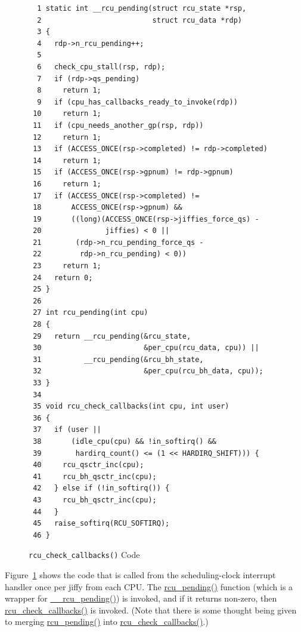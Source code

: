 \begin{figure}[tbp]
{ \scriptsize
\begin{verbatim}
  1 static int __rcu_pending(struct rcu_state *rsp,
  2                          struct rcu_data *rdp)
  3 {
  4   rdp->n_rcu_pending++;
  5 
  6   check_cpu_stall(rsp, rdp);
  7   if (rdp->qs_pending)
  8     return 1;
  9   if (cpu_has_callbacks_ready_to_invoke(rdp))
 10     return 1;
 11   if (cpu_needs_another_gp(rsp, rdp))
 12     return 1;
 13   if (ACCESS_ONCE(rsp->completed) != rdp->completed)
 14     return 1;
 15   if (ACCESS_ONCE(rsp->gpnum) != rdp->gpnum)
 16     return 1;
 17   if (ACCESS_ONCE(rsp->completed) !=
 18       ACCESS_ONCE(rsp->gpnum) &&
 19       ((long)(ACCESS_ONCE(rsp->jiffies_force_qs) -
 20               jiffies) < 0 ||
 21        (rdp->n_rcu_pending_force_qs -
 22         rdp->n_rcu_pending) < 0))
 23     return 1;
 24   return 0;
 25 }
 26 
 27 int rcu_pending(int cpu)
 28 {
 29   return __rcu_pending(&rcu_state,
 30                        &per_cpu(rcu_data, cpu)) ||
 31          __rcu_pending(&rcu_bh_state,
 32                        &per_cpu(rcu_bh_data, cpu));
 33 }
 34 
 35 void rcu_check_callbacks(int cpu, int user)
 36 {
 37   if (user ||
 38       (idle_cpu(cpu) && !in_softirq() &&
 39        hardirq_count() <= (1 << HARDIRQ_SHIFT))) {
 40     rcu_qsctr_inc(cpu);
 41     rcu_bh_qsctr_inc(cpu);
 42   } else if (!in_softirq()) {
 43     rcu_bh_qsctr_inc(cpu);
 44   }
 45   raise_softirq(RCU_SOFTIRQ);
 46 }
\end{verbatim}
}
\caption{{\tt rcu\_check\_callbacks()} Code}
\label{fig:app:rcuimpl:rcutreewt:Code for rcutree rcu-check-callbacks}
\end{figure}

Figure~\ref{fig:app:rcuimpl:rcutreewt:Code for rcutree rcu-check-callbacks}
shows the code that is called from the scheduling-clock interrupt
handler once per jiffy from each CPU.
The \url{rcu_pending()} function (which is a wrapper for \url{__rcu_pending()})
is invoked, and if it returns non-zero, then \url{rcu_check_callbacks()}
is invoked.
(Note that there is some thought being given to merging \url{rcu_pending()}
into \url{rcu_check_callbacks()}.)

